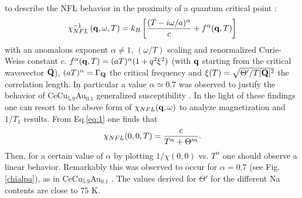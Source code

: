 \documentclass[prb,showpacs,preprintnumbers,amsmath,amssymb,floatfix]{revtex4}
\begin{document}
to describe the NFL behavior  in the proximity of a quantum
critical point \cite{uno,due}:
\begin{equation}
\label{eq:1}
          \chi_{NFL}^{-1}\,({\bf q},\omega,T)=
          k_B
          \left[\frac{(T-i\omega/a)^{\alpha}}{c}
          +f^{\alpha} ({\bf q},T)
          \right]
\end{equation}
with an anomalous exponent $\alpha\neq 1$, $(\omega/T)$ scaling
and renormalized Curie-Weiss constant $c$. $f^{\alpha} ({\bf
q},T)=(aT)^{\alpha}(1+ q^2\xi^2)$ (with ${\bf q}$ starting from
the critical wavevector ${\bf Q}$), $(aT)^{\alpha}=\Gamma_{\bf Q}$
the critical frequency and $\xi(T)=\sqrt{\Theta' /T \vert {\bf
Q}\vert^2}$ the correlation length. In particular a value
$\alpha\simeq 0.7$ was observed to justify the behavior of
CeCu$_{5.9}$Au$_{0.1}$ generalized susceptibility \cite{uno,tre}.
In the light of these findings one can resort to the above form of
$\chi_{NFL}({\bf q},\omega)$ to analyze magnetization and $1/T_1$
results. From Eq.\ref{eq:1} one finds that
\begin{equation}
\label{eq:2}
          \chi_{NFL}(0,0,T)= {c\over T^{\alpha} + \Theta '^{\alpha}} .
\end{equation}
Then, for a certain value of $\alpha$ by plotting $1/\chi(0,0)$
vs. $T^{\alpha}$ one should observe a linear behavior. Remarkably
this was observed to occur for $\alpha=0.7$ (see
Fig.\ref{chialpa}), as in CeCu$_{5.9}$Au$_{0.1}$ \cite{vonL}. The
values derived for $\Theta'$ for the different Na contents are
close to $75$ K.
\end{document}
